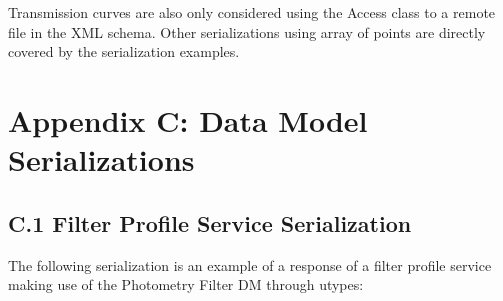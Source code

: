 \documentclass[11pt,a4paper]{ivoa}
\begin{document}
Transmission curves are also only considered using the Access class to a remote file in the XML schema. Other serializations using array of points are directly covered by the serialization examples.
\par

\section{Appendix C: Data Model Serializations}
\subsection{C.1 Filter Profile Service Serialization}

The following serialization is an example of a response of a filter profile service making use of the Photometry Filter DM through utypes:
\par
\end{document}
